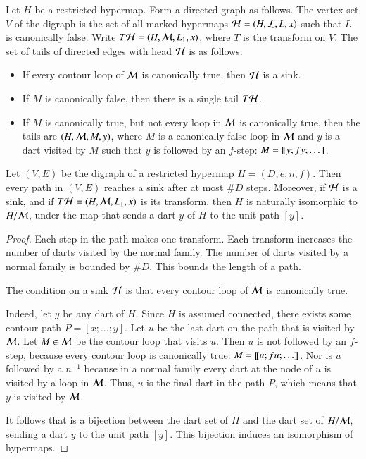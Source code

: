 \begin{definition}
Let $H$ be a restricted hypermap.  Form a directed graph as follows.
The vertex set $V$ of the digraph is the set of all marked hypermaps 
${\cal H}=(H,{\cal L},L,x)$ such that $L$ is canonically false.  
Write $T{\cal H} = (H,{\cal M},L_1,x)$, where $T$ is the transform on $V$.  
The set of tails of directed edges with head ${\cal H}$ is as follows:
\begin{itemize}
\item If every contour loop of ${\cal M}$ is canonically true, then ${\cal H}$ is a sink.
\item If $M$ is canonically false, 
then there is a single tail $T{\cal H}$.
\item If $M$ is canonically true, but not every loop in ${\cal M}$ is canonically true,
then the tails are $(H,{\cal M},M,y)$, where $M$ is a 
canonically false loop in ${\cal M}$ and $y$ is a dart visited by $M$ such
that $y$ is followed by an $f$-step:  $M = {\llbracket{y;f y;\ldots}\rrbracket}$.
\end{itemize}
\end{definition}

\begin{lemma}\label{lemma:digraph-sink}
Let $(V,E)$ be the digraph of a restricted hypermap $H=(D,e,n,f)$.  Then every path
in $(V,E)$ reaches a sink after at most $\#D$ steps.  Moreover, if ${\cal H}$ is
a sink, and if $T{\cal H} =(H,{\cal M},L_1,x)$ is its transform, then
$H$ is naturally isomorphic to $H/{\cal M}$, under the map that sends
a dart $y$ of $H$ to the unit path $[y]$.
\end{lemma}

\begin{proof} Each step in the path makes one transform.  Each
  transform increases the number of darts visited by the normal
  family.  The number of darts visited by a normal family is bounded
  by $\#D$.  This bounds the length of a path.

  The condition on a sink ${\cal H}$ is that every contour loop of
  ${\cal M}$ is canonically true. 

  Indeed, let $y$ be any dart of
$H$. Since $H$ is assumed connected, there exists some contour path
$P=[x;\ldots;y]$.  Let $u$ be the last dart on the path that is
visited by ${\cal M}$.  Let $M\in{\cal M}$ be the contour loop that
visits $u$.  Then $u$ is not followed by an $f$-step, because every contour
loop is canonically true: $M = {\llbracket{u;f u;\ldots}\rrbracket}$.
Nor is $u$ followed by a $n^{-1}$ because in a normal family every dart
at the node of $u$ is visited by a loop in ${\cal M}$.  Thus, $u$ is the final
dart in the path $P$, which means that $y$ is visited by ${\cal M}$.

It follows that is a bijection between the dart set of $H$ and the
dart set of $H/{\cal M}$, sending a dart $y$ to the unit path $[y]$.
This bijection induces an isomorphism of hypermaps.
\end{proof}



